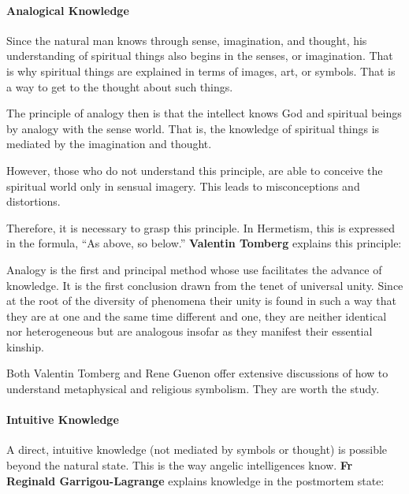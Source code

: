 \paragraph{Analogical Knowledge}
Since the natural man knows through sense, imagination, and thought, his understanding of spiritual things also begins in the senses, or imagination. That is why spiritual things are explained in terms of images, art, or symbols. That is a way to get to the thought about such things.

The principle of analogy then is that the intellect knows God and spiritual beings by analogy with the sense world. That is, the knowledge of spiritual things is mediated by the imagination and thought.

However, those who do not understand this principle, are able to conceive the spiritual world only in sensual imagery. This leads to misconceptions and distortions.

Therefore, it is necessary to grasp this principle. In Hermetism, this is expressed in the formula, “As above, so below.”\textbf{ Valentin Tomberg} explains this principle:

\begin{quotex}
Analogy is the first and principal method whose use facilitates the advance of knowledge. It is the first conclusion drawn from the tenet of universal unity. Since at the root of the diversity of phenomena their unity is found in such a way that they are at one and the same time different and one, they are neither identical nor heterogeneous but are analogous insofar as they manifest their essential kinship. 

\end{quotex}
Both Valentin Tomberg and Rene Guenon offer extensive discussions of how to understand metaphysical and religious symbolism. They are worth the study.

\paragraph{Intuitive Knowledge}
A direct, intuitive knowledge (not mediated by symbols or thought) is possible beyond the natural state. This is the way angelic intelligences know. \textbf{Fr Reginald Garrigou-Lagrange} explains knowledge in the postmortem state:

